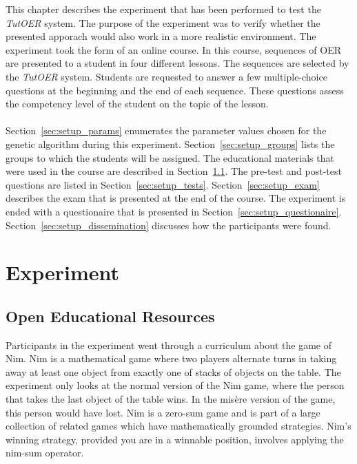 This chapter describes the experiment that has been performed to test the
\emph{TutOER} system. The purpose of the experiment was to verify whether the
presented apporach would also work in a more realistic environment. The
experiment took the form of an online course. In this course, sequences of OER
are presented to a student in four different lessons. The sequences are
selected by the \emph{TutOER} system. Students are requested to answer a few
multiple-choice questions at the beginning and the end of each sequence. These
questions assess the competency level of the student on the topic of the
lesson.\\\\
\noindent
Section~\ref{sec:setup_params} enumerates the parameter values chosen for the
genetic algorithm during this experiment. Section~\ref{sec:setup_groups} lists the
groups to which the students will be assigned. The educational materials that
were used in the course are described in Section~\ref{sec:setup_material}. The
pre-test and post-test questions are listed in Section~\ref{sec:setup_tests}.
Section~\ref{sec:setup_exam} describes the exam that is presented at the end of
the course. The experiment is ended with a questionaire that is presented in
Section~\ref{sec:setup_questionaire}. Section~\ref{sec:setup_dissemination} discusses
how the participants were found.
\section{Experiment}
\subsection{Open Educational Resources}
\label{sec:setup_material}
Participants in the experiment went through a curriculum about the game of Nim.
Nim is a mathematical game where two players alternate turns in taking away at
least one object from exactly one of stacks of objects on the table. The
experiment only looks at the normal version of the Nim game, where the person
that takes the last object of the table wins. In the mis\`{e}re version of the
game, this person would have lost. Nim is a zero-sum game and is part of a
large collection of related games which have mathematically grounded
strategies. Nim's winning strategy, provided you are in a winnable position,
involves applying the nim-sum operator. %

